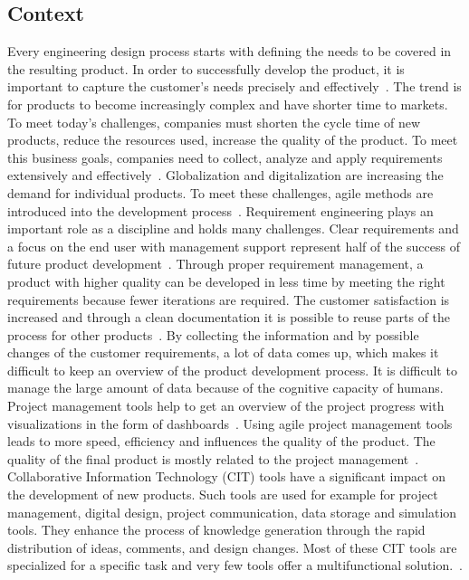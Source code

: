     \subsection*{Context}
    Every engineering design process starts with defining the needs to be covered in the resulting product. In order to successfully develop the product, it is important to capture the customer's needs precisely and effectively~\cite{liu2012scenario}.
    The trend is for products to become increasingly complex and have shorter time to markets.
    To meet today's challenges, companies must shorten the cycle time of new products, reduce the resources used, increase the quality of the product. To meet this business goals, companies need to collect, analyze and apply requirements extensively and effectively~\cite{Ahti2005}. Globalization and digitalization are increasing the demand for individual products. To meet these challenges, agile methods are introduced into the development process~\cite{HEIMICKE2021786}. Requirement engineering plays an important role as a discipline and holds many challenges. Clear requirements and a focus on the end user with management support represent half of the success of future product development~\cite{6226784}.
    Through proper requirement management, a product with higher quality can be developed in less time by meeting the right requirements because fewer iterations are required. The customer satisfaction is increased and through a clean documentation it is possible to reuse parts of the process for other products~\cite{BAXTER2008585}.
    By collecting the information and by possible changes of the customer requirements, a lot of data comes up, which makes it difficult to keep an overview of the product development process. It is difficult to manage the large amount of data because of the cognitive capacity of humans. Project management tools help to get an overview of the project progress with visualizations in the form of dashboards~\cite{RICHTER2020271}.
    Using agile project management tools leads to more speed, efficiency and influences the quality of the product. The quality of the final product is mostly related to the project management~\cite{ozkan2019agile}. 
    Collaborative Information Technology (CIT) tools have a significant impact on the development of new products. Such tools are used for example for project management, digital design, project communication, data storage and simulation tools. They enhance the process of knowledge generation through the rapid distribution of ideas, comments, and design changes. Most of these CIT tools are specialized for a specific task and very few tools offer a multifunctional solution.~\cite{MarionTucker}.
    
